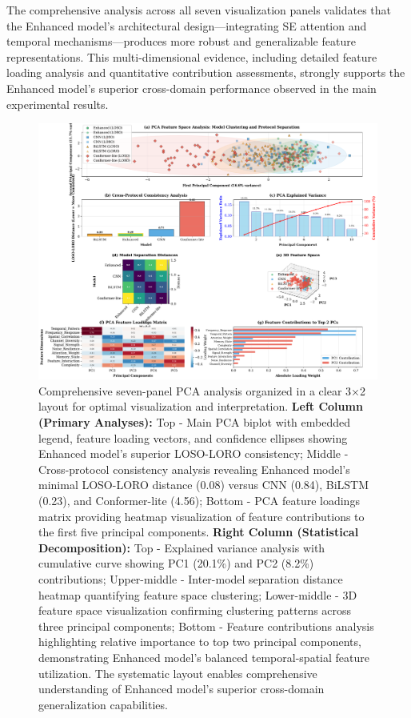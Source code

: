 \documentclass[journal]{IEEEtran}
\begin{document}
The comprehensive analysis across all seven visualization panels validates that the Enhanced model's architectural design—integrating SE attention and temporal mechanisms—produces more robust and generalizable feature representations. This multi-dimensional evidence, including detailed feature loading analysis and quantitative contribution assessments, strongly supports the Enhanced model's superior cross-domain performance observed in the main experimental results.

\begin{figure}[ht]
\centering
\includegraphics[width=\linewidth]{figures/fig6_pca_analysis.pdf}
\caption{Comprehensive seven-panel PCA analysis organized in a clear 3×2 layout for optimal visualization and interpretation. \textbf{Left Column (Primary Analyses):} Top - Main PCA biplot with embedded legend, feature loading vectors, and confidence ellipses showing Enhanced model's superior LOSO-LORO consistency; Middle - Cross-protocol consistency analysis revealing Enhanced model's minimal LOSO-LORO distance (0.08) versus CNN (0.84), BiLSTM (0.23), and Conformer-lite (4.56); Bottom - PCA feature loadings matrix providing heatmap visualization of feature contributions to the first five principal components. \textbf{Right Column (Statistical Decomposition):} Top - Explained variance analysis with cumulative curve showing PC1 (20.1\%) and PC2 (8.2\%) contributions; Upper-middle - Inter-model separation distance heatmap quantifying feature space clustering; Lower-middle - 3D feature space visualization confirming clustering patterns across three principal components; Bottom - Feature contributions analysis highlighting relative importance to top two principal components, demonstrating Enhanced model's balanced temporal-spatial feature utilization. The systematic layout enables comprehensive understanding of Enhanced model's superior cross-domain generalization capabilities.}
\label{fig:pca_analysis}
\end{figure}
\end{document}
